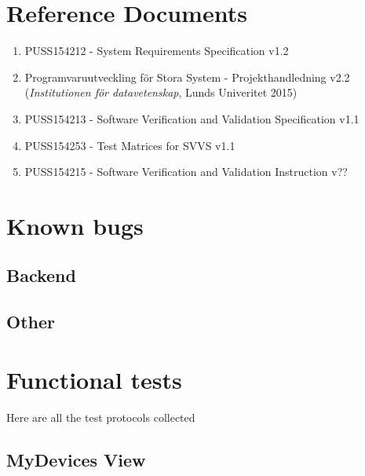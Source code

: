 \documentclass[a4paper]{article}
\begin{document}
\setcounter{tocdepth}{2}
\tableofcontents
\newpage
{}


\section*{Reference Documents}
\begin{enumerate}
\item PUSS154212 - System Requirements Specification v1.2 \label{refdocs:srs} 
\item Programvaruutveckling för Stora System - Projekthandledning v2.2 \newline (\textit{Institutionen för datavetenskap}, Lunds Univeritet 2015) \label{refdocs:projekthandledning}
\item PUSS154213 - Software Verification and Validation Specification v1.1 \label{refdocs:SVVS}
\item PUSS154253 - Test Matrices for SVVS v1.1 \label{refdocs:matrices}
\item PUSS154215 - Software Verification and Validation Instruction v?? \label{refdocs:SVVI}
\end{enumerate}

\section{Known bugs}

\subsection{Backend}

\subsection{Other}

\clearpage
\section{Functional tests}
Here are all the test protocols collected

\subsection{MyDevices View}


\end{document}
